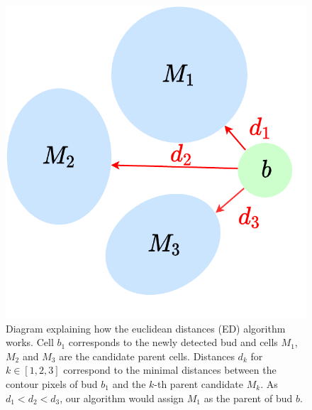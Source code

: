 \documentclass{TP}
\begin{document}
\begin{figure}[h]
\centering
\captionsetup{justification=raggedright}
\includegraphics[width=0.7\linewidth]{Schemas et illustrations/ed.pdf}
\caption{Diagram explaining how the euclidean distances (ED) algorithm works. Cell $b_1$ corresponds to the newly detected bud and cells $M_1$, $M_2$ and $M_3$ are the candidate parent cells. Distances $d_{k}$ for $k \in [1,2,3]$ correspond to the minimal distances between the contour pixels of bud $b_1$ and the $k$-th parent candidate $M_k$. As $d_{1} < d_{2} < d_{3}$, our algorithm would assign $M_1$ as the parent of bud $b$.}
\label{fig: euclidean dist algo}
\end{figure}
\end{document}
